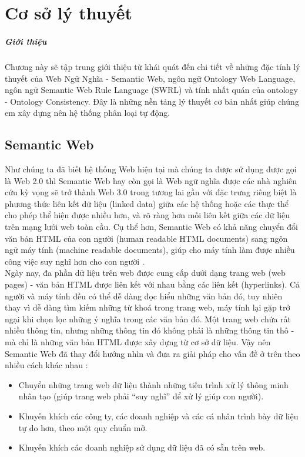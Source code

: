 \chapter{Cơ sở lý thuyết}
\paragraph{Giới thiệu} Chương này sẽ tập trung giới thiệu từ khái quát đến chi tiết về những đặc tính lý thuyết của Web Ngữ Nghĩa - Semantic Web, ngôn ngữ Ontology Web Language, ngôn ngữ Semantic Web Rule Language (SWRL) và tính nhất quán của ontology - Ontology Consistency. Đây là những nền tảng lý thuyết cơ bản nhất giúp chúng em xây dựng nên hệ thống phân loại tự động.

\section{Semantic Web}
Như chúng ta đã biết hệ thống Web hiện tại mà chúng ta được sử dụng được gọi là Web 2.0 thì Semantic Web hay còn gọi là Web ngữ nghĩa được các nhà nghiên cứu kỳ vọng sẽ trở thành Web 3.0 trong tương lai gần với đặc trưng riêng biệt là phương thức liên kết dữ liệu (linked data) giữa các hệ thống hoặc các thực thể cho phép thể hiện được nhiều hơn, và rõ ràng hơn mối liên kết giữa các dữ liệu trên mạng lưới web toàn cầu. Cụ thể hơn, Semantic Web có khả năng chuyển đổi văn bản HTML của con người (human readable HTML documents) sang ngôn ngữ máy tính (machine readable documents), giúp cho máy tính làm được nhiều công việc suy nghĩ hơn cho con người \cite{semantic1}. 
\\
Ngày nay, đa phần dữ liệu trên web được cung cấp dưới dạng trang web (web pages) - văn bản HTML được liên kết với nhau bằng các liên kết (hyperlinks). Cả người và máy tính đều có thể dễ dàng đọc hiểu những văn bản đó, tuy nhiên thay vì dễ dàng tìm kiếm những từ khoá trong trang web, máy tính lại gặp trở ngại khi chọn lọc những ý nghĩa trong các văn bản đó. Một trang web chứa rất nhiều thông tin, nhưng những thông tin đó không phải là những thông tin thô - mà chỉ là những văn bản HTML được xây dựng từ cơ sở dữ liệu. Vậy nên Semantic Web đã thay đổi hướng nhìn và đưa ra giải pháp cho vấn đề ở trên theo nhiều cách khác nhau :
\begin{itemize}
	\item Chuyển những trang web dữ liệu thành những tiến trình xử lý thông minh nhân tạo (giúp trang web phải “suy nghĩ” để xử lý giúp con người).
	\item Khuyến khích các công ty, các doanh nghiệp và các cá nhân trình bày dữ liệu tự do hơn, theo một quy chuẩn mở.
	\item Khuyến khích các doanh nghiệp sử dụng dữ liệu đã có sẵn trên web.
\end{itemize}
 
